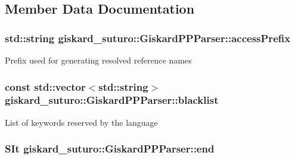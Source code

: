 \subsection{Member Data Documentation}
\hypertarget{classgiskard__suturo_1_1GiskardPPParser_aab4e3732ffd6ad76e3915e17b3655b0c}{
\subsubsection[{access\-Prefix}]{\setlength{\rightskip}{0pt plus 5cm}std\-::string giskard\-\_\-suturo\-::\-Giskard\-P\-P\-Parser\-::access\-Prefix\hspace{0.3cm}{\ttfamily [private]}}}\label{classgiskard__suturo_1_1GiskardPPParser_aab4e3732ffd6ad76e3915e17b3655b0c}
Prefix used for generating resolved reference names \hypertarget{classgiskard__suturo_1_1GiskardPPParser_a23c7988ac4807b6c10ff00bd4f340b9e}{
\subsubsection[{blacklist}]{\setlength{\rightskip}{0pt plus 5cm}const std\-::vector$<$std\-::string$>$ giskard\-\_\-suturo\-::\-Giskard\-P\-P\-Parser\-::blacklist\hspace{0.3cm}{\ttfamily [private]}}}\label{classgiskard__suturo_1_1GiskardPPParser_a23c7988ac4807b6c10ff00bd4f340b9e}
List of keywords reserved by the language \hypertarget{classgiskard__suturo_1_1GiskardPPParser_a22435e6cc45304914888b6c53b3eeb17}{
\subsubsection[{end}]{\setlength{\rightskip}{0pt plus 5cm}S\-It giskard\-\_\-suturo\-::\-Giskard\-P\-P\-Parser\-::end\hspace{0.3cm}{\ttfamily [private]}}}\label{classgiskard__suturo_1_1GiskardPPParser_a22435e6cc45304914888b6c53b3eeb17}

